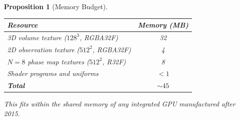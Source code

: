 \documentclass[11pt,twocolumn,a4paper]{article}
\newtheorem{proposition}[theorem]{Proposition}
\begin{document}
\begin{proposition}[Memory Budget]
\label{prop:memory-budget}
\begin{center}
\small
\begin{tabular}{@{}lc@{}}
\toprule
\textbf{Resource} & \textbf{Memory (MB)} \\
\midrule
3D volume texture ($128^3$, RGBA32F) & 32 \\
2D observation texture ($512^2$, RGBA32F) & 4 \\
$N=8$ phase map textures ($512^2$, R32F) & 8 \\
Shader programs and uniforms & $<\!1$ \\
\midrule
\textbf{Total} & $\sim\!45$ \\
\bottomrule
\end{tabular}
\end{center}
This fits within the shared memory of any integrated GPU manufactured
after 2015.
\end{proposition}



\end{document}
